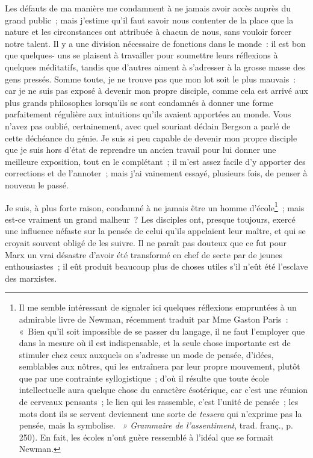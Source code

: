 \documentclass[french,twoside]{book} %
\begin{document}
Les défauts de ma manière me condamnent à ne jamais avoir accès auprès du grand public ; mais j’estime qu’il faut savoir nous contenter de la place que la nature et les circonstances ont attribuée à chacun de nous, sans vouloir forcer notre talent. Il y a une division nécessaire de fonctions dans le monde : il est bon que quelques- uns se plaisent à travailler pour soumettre leurs réflexions à quelques méditatifs, tandis que d’autres aiment à s’adresser à la grosse masse des gens pressés. Somme toute, je ne trouve pas que mon lot soit le plus mauvais : car je ne suis pas exposé à devenir mon propre disciple, comme cela est arrivé aux plus grands philosophes lorsqu’ils se sont condamnés à donner une forme parfaitement régulière aux intuitions qu’ils avaient apportées au monde. Vous n’avez pas oublié, certainement, avec quel souriant dédain Bergson a parlé de cette déchéance du génie. Je suis si peu capable de devenir mon propre disciple que je suis hors d’état de reprendre un ancien travail pour lui donner une meilleure exposition, tout en le complétant ; il m’est assez facile d’y apporter des corrections et de l’annoter ; mais j’ai vainement essayé, plusieurs fois, de penser à nouveau le passé.\par
Je suis, à plus forte raison, condamné à ne jamais être un homme d’école\footnote{  \noindent Il me semble intéressant de signaler ici quelques réflexions empruntées à un admirable livre de Newman, récemment traduit par Mme Gaston Paris : « Bien qu’il soit impossible de se passer du langage, il ne faut l’employer que dans la mesure où il est indispensable, et la seule chose importante est de stimuler chez ceux auxquels on s’adresse un mode de pensée, d’idées, semblables aux nôtres, qui les entraînera par leur propre mouvement, plutôt que par une contrainte syllogistique ; d’où il résulte que toute école intellectuelle aura quelque chose du caractère ésotérique, car c’est une réunion de cerveaux pensants ; le lien qui les rassemble, c’est l’unité de pensée ; les mots dont ils se servent deviennent une sorte de \emph{tessera} qui n’exprime pas la pensée, mais la symbolise. \emph{ » Grammaire de l’assentiment}, trad. franç., p. 250). En fait, les écoles n’ont guère ressemblé à l’idéal que se formait Newman.
 } ; mais est-ce vraiment un grand  malheur ? Les disciples ont, presque toujours, exercé une influence néfaste sur la pensée de celui qu’ils appelaient leur maître, et qui se croyait souvent obligé de les suivre. Il ne paraît pas douteux que ce fut pour Marx un vrai désastre d’avoir été transformé en chef de secte par de jeunes enthousiastes ; il eût produit beaucoup plus de choses utiles s’il n’eût été l’esclave des marxistes.\par
\end{document}
